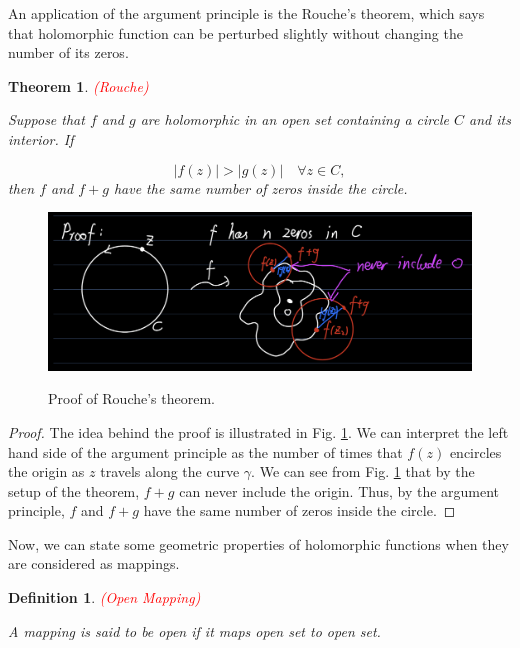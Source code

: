 \documentclass{article}
\newtheorem{definition}{Definition}
\newtheorem{theorem}{Theorem}
\begin{document}
An application of the argument principle is the Rouche's theorem, which says that holomorphic function can be perturbed slightly without changing the number of its zeros. 

\begin{theorem} \label{thm:rouche} \textcolor{red}{(Rouche)}

Suppose that $f$ and $g$ are holomorphic in an open set containing a circle $C$ and its interior. If 

\begin{equation*}
|f(z)|>|g(z)| \quad \forall z\in C,
\end{equation*}
then $f$ and $f+g$ have the same number of zeros inside the circle. 
\end{theorem}

\begin{figure}
\centering
\includegraphics[scale=0.3]{Rouche.png} \\
\caption{Proof of Rouche's theorem.} 
\label{fig:rouche}
\end{figure}


\begin{proof}
The idea behind the proof is illustrated in Fig. \ref{fig:rouche}. We can interpret the left hand side of the argument principle as the number of times that $f(z)$ encircles the origin as $z$ travels along the curve $\gamma$. We can see from Fig. \ref{fig:rouche} that by the setup of the theorem, $f+g$ can never include the origin. Thus, by the argument principle, $f$ and $f+g$ have the same number of zeros inside the circle.
\end{proof}

Now, we can state some geometric properties of holomorphic functions when they are considered as mappings. 

\begin{definition} \textcolor{red}{(Open Mapping)}

A mapping is said to be open if it maps open set to open set.
\end{definition}
\end{document}
